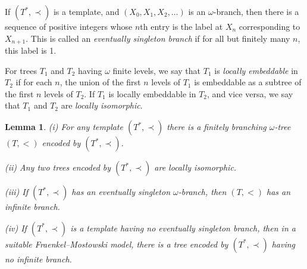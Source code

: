 \documentclass[a4paper,reqno]{amsart}
\numberwithin{equation}{section}
\newtheorem{lemma}[theorem]{Lemma}
\begin{document}
If $(T^*, \prec)$ is a template, and $(X_0, X_1, X_2, \ldots)$ is an $\omega$-branch, then there is a sequence of positive integers
whose $n$th entry is the label at $X_n$ corresponding to $X_{n+1}$. This is called an {\em eventually singleton branch} if 
for all but finitely many $n$, this label is 1.

For trees $T_1$ and $T_2$ having $\omega$ finite levels, we say that $T_1$ is {\em locally embeddable} in $T_2$ if for 
each $n$, the union of the first $n$ levels of $T_1$ is embeddable as a subtree of the first $n$ levels of $T_2$. 
If $T_1$ is locally embeddable in $T_2$, and vice versa, we say that $T_1$ and $T_2$ are {\em locally isomorphic}. 

\begin{lemma} (i) For any template $(T^*, \prec)$ there is a finitely branching $\omega$-tree $(T, <)$ encoded by $(T^*, \prec)$.

(ii) Any two trees encoded by $(T^*, \prec)$ are locally isomorphic.

(iii) If $(T^*, \prec)$ has an eventually singleton $\omega$-branch, then $(T, <)$ has an infinite branch.

(iv) If $(T^*, \prec)$ is a template having no eventually singleton branch, then in a suitable Fraenkel--Mostowski model, 
there is a tree encoded by $(T^*, \prec)$ having no infinite branch. \label{4.3}  \end{lemma}
\end{document}

